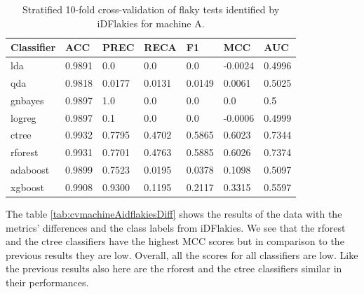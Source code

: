 \documentclass{seal_thesis}
\begin{document}
\begin{table}[ht]
\centering
\begin{tabular}{|l|l|l|l|l|l|l|}
\hline
\textbf{Classifier} & \textbf{ACC} & \textbf{PREC} & \textbf{RECA} & \textbf{F1} & \textbf{MCC} & \textbf{AUC} \\ \hline
lda & 0.9891 & 0.0 & 0.0 & 0.0 & -0.0024 & 0.4996 \\ \hline
qda & 0.9818 & 0.0177 & 0.0131 & 0.0149 & 0.0061 & 0.5025 \\ \hline
gnbayes & 0.9897 & 1.0 & 0.0 & 0.0 & 0.0 & 0.5 \\ \hline
logreg & 0.9897 & 0.1 & 0.0 & 0.0 & -0.0006 & 0.4999 \\ \hline
ctree & 0.9932 & 0.7795 & 0.4702 & 0.5865 & 0.6023 & 0.7344 \\ \hline
rforest & 0.9931 & 0.7701 & 0.4763 & 0.5885 & 0.6026 & 0.7374 \\ \hline
adaboost & 0.9899 & 0.7523 & 0.0195 & 0.0378 & 0.1098 & 0.5097 \\ \hline
xgboost & 0.9908 & 0.9300 & 0.1195 & 0.2117 & 0.3315 & 0.5597 \\ \hline
\end{tabular}
\caption{Stratified 10-fold cross-validation of flaky tests identified by iDFlakies for machine A.}
\label{tab:cvmachineAidflakies}
\end{table}



\noindent The table \ref{tab:cvmachineAidflakiesDiff} shows the results of the data with the metrics' differences and the class labels from iDFlakies. We see that the rforest and the ctree classifiers have the highest MCC scores but in comparison to the previous results they are low. Overall, all the scores for all classifiers are low. Like the previous results also here are the rforest and the ctree classifiers similar in their performances.
\end{document}
